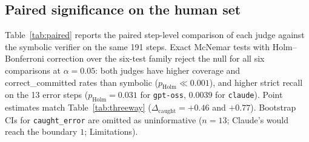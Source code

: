 \subsection{Paired significance on the human set}
Table~\ref{tab:paired} reports the paired step-level comparison of each judge
against the symbolic verifier on the same 191 steps. Exact McNemar tests with
Holm--Bonferroni correction over the six-test family
\citep{dror2018hitchhikers} reject the null for all six comparisons at
$\alpha{=}0.05$: both judges have higher coverage and
correct\_committed rates than symbolic ($p_{\mathrm{Holm}}\!\ll\!0.001$), and
higher strict recall on the 13 error steps
($p_{\mathrm{Holm}}{=}0.031$ for \texttt{gpt-oss}, $0.0039$ for
\texttt{claude}). Point estimates match Table~\ref{tab:threeway}
($\Delta_{\mathrm{caught}}{=}{+}0.46$ and ${+}0.77$). Bootstrap CIs for
\texttt{caught\_error} are omitted as uninformative ($n{=}13$; Claude's would
reach the boundary $1$; Limitations).

\begin{table}[t]
\centering
\small
{}
\caption{Paired step-level differences (judge $-$ symbolic). Primary test:
exact McNemar on discordant pairs; Holm--Bonferroni over six tests
($\alpha{=}0.05$). Bootstrap CIs are descriptive where shown; omitted for
\texttt{caught\_error} ($n{=}13$; uninformative, since Claude's interval would
reach 1).}
\label{tab:paired}
\end{table}

